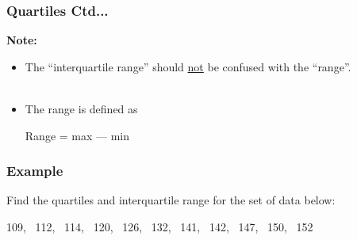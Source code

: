 \documentclass[xcolor=svgnames, compress]{beamer}
\begin{document}
\begin{frame}
\frametitle{Quartiles Ctd...}

\textbf{Note:}

\begin{itemize}
\item	The ``interquartile range'' should \underline{not} be confused with the ``\alert{range}''. \\
\hfill\\
\item	The \alert{range} is defined as\\
	\begin{center}
	Range = max --- min
	\end{center}
\end{itemize}

\end{frame}





\begin{frame}[t]
\frametitle{Example}
Find the quartiles and interquartile range for the set of data below:

\begin{center}
109, ~112, ~114, ~120, ~126, ~132, ~141, ~142, ~147, ~150, ~152
\end{center}

\end{frame}



\end{document}

